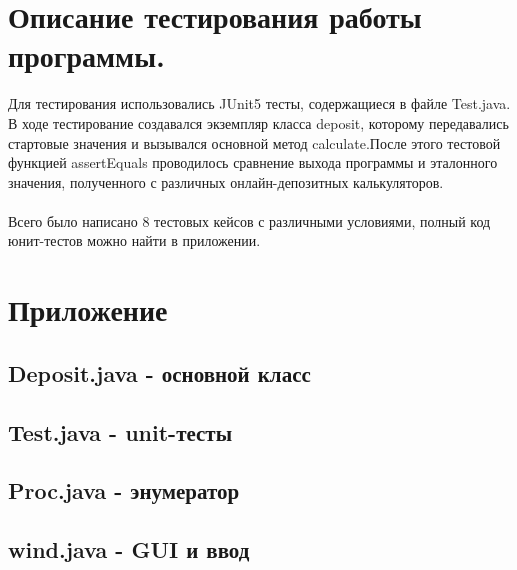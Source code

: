 \section{Описание тестирования работы программы.}
Для тестирования использовались JUnit5 тесты, содержащиеся в файле Test.java.
\\В ходе тестирование создавался экземпляр класса deposit, которому передавались стартовые значения и вызывался основной метод calculate.После этого тестовой функцией assertEquals проводилось сравнение выхода программы и эталонного значения, полученного с различных онлайн-депозитных калькуляторов.\\
\\Всего было написано 8 тестовых кейсов с различными условиями, полный код юнит-тестов можно найти в приложении.
\section{Приложение}
\subsection{Deposit.java - основной класс}

\subsection{Test.java - unit-тесты}

\subsection{Proc.java - энумератор}

\subsection{wind.java - GUI и ввод}


